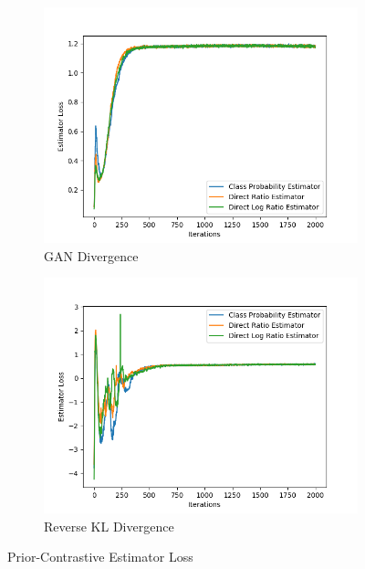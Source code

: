 \documentclass[honours,12pt]{unswthesis}
\numberwithin{equation}{section}
\theoremstyle{definition}
\begin{document}
\begin{figure}
\begin{subfigure}{0.49\textwidth}
\includegraphics[width=\linewidth]{part2estimatorlosses/PCADVvsPCADVexpvsPCADVgudlog.png}
\caption{GAN Divergence}
\end{subfigure}
\begin{subfigure}{0.49\textwidth}
\includegraphics[width=\linewidth]{part2estimatorlosses/PCKLDvsPCKLexpvsPCKLgudlog.png}
\caption{Reverse KL Divergence}
\end{subfigure}
\caption{Prior-Contrastive Estimator Loss}
\end{figure}
\end{document}
